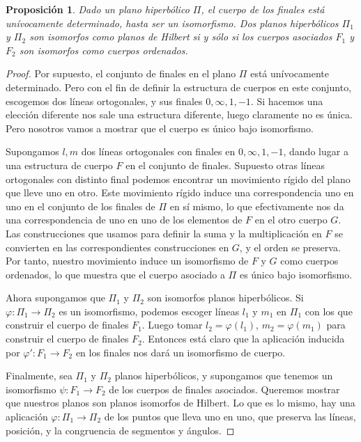 \documentclass[a4paper]{amsart}
\theoremstyle{plain}
\newtheorem{proposition}{Proposición}
\begin{document}
\begin{proposition}
Dado un plano hiperbólico $\Pi$, el cuerpo de los finales está unívocamente determinado, hasta ser un isomorfismo. Dos planos hiperbólicos $\Pi_1$ y $\Pi_2$ son isomorfos como planos de Hilbert si y sólo si los cuerpos asociados $F_1$ y $F_2$ son isomorfos como cuerpos ordenados.
\end{proposition}

\begin{proof}
Por supuesto, el conjunto de finales en el plano $\Pi$ está unívocamente determinado. Pero con el fin de definir la estructura de cuerpos en este conjunto, escogemos dos líneas ortogonales, y sus finales $0,\infty,1,-1$. Si hacemos una elección diferente nos sale una estructura diferente, luego claramente no es única. Pero nosotros vamos a mostrar que el cuerpo es único bajo isomorfismo.

Supongamos $l,m$ dos líneas ortogonales con finales en $0,\infty,1,-1$, dando lugar a una estructura de cuerpo $F$ en el conjunto de finales. Supuesto otras líneas ortogonales con distinto final podemos encontrar un movimiento rígido del plano que lleve uno en otro. Este movimiento rígido induce una correspondencia uno en uno en el conjunto de los finales de $\Pi$ en sí mismo, lo que efectivamente nos da una correspondencia de uno en uno de los elementos de $F$ en el otro cuerpo  $G$. Las construcciones que usamos para definir la suma y la multiplicación en $F$ se convierten en las correspondientes construcciones en $G$, y el orden se preserva. Por tanto, nuestro movimiento induce un isomorfismo de $F$ y $G$ como cuerpos ordenados, lo que muestra que el cuerpo asociado a $\Pi$ es único bajo isomorfismo.

Ahora supongamos que $\Pi_1$ y $\Pi_2$ son isomorfos planos hiperbólicos. Si $\varphi :\Pi_1\rightarrow\Pi_2$ es un isomorfismo, podemos escoger líneas $l_1$ y $m_1$ en $\Pi_1$ con los que construir el cuerpo de finales $F_1$. Luego tomar $l_2=\varphi(l_1)$, $m_2=\varphi(m_1)$ para construir el cuerpo de finales $F_2$. Entonces está claro que la aplicación inducida por $\varphi':F_1\rightarrow F_2$ en los finales nos dará un isomorfismo de cuerpo.

Finalmente, sea $\Pi_1$ y $\Pi_2$ planos hiperbólicos, y supongamos que tenemos un isomorfismo $\psi:F_1\rightarrow F_2 $ de los cuerpos de finales asociados. Queremos mostrar que nuestros planos son planos isomorfos de Hilbert. Lo que es lo mismo, hay una aplicación $\varphi:\Pi_1\rightarrow \Pi_2$ de los puntos que lleva uno en uno, que preserva las líneas, posición, y la congruencia de segmentos y ángulos.


\end{proof}
\end{document}
